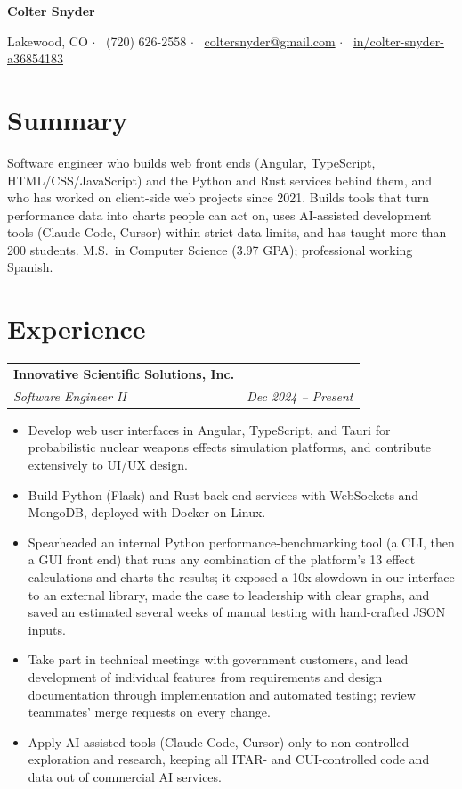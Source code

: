 \documentclass[letterpaper,10pt]{article}
\makeatletter
\newcommand{\entry}[4]{%
  \begin{tabularx}{\linewidth}{@{}X r@{}}
    \textbf{#1} & #2 \\
    \textit{#3} & \textit{\small #4} \\
  \end{tabularx}\vspace{-2pt}%
}
\makeatother
\begin{document}
\begin{center}
  {\Huge\bfseries Colter Snyder}\par\vspace{4pt}
  \small
  Lakewood, CO \enspace$\cdot$\enspace
  \faPhone*\ (720) 626-2558 \enspace$\cdot$\enspace
  \faEnvelope\ \href{mailto:coltersnyder@gmail.com}{coltersnyder@gmail.com} \enspace$\cdot$\enspace
  \faLinkedin\ \href{https://www.linkedin.com/in/colter-snyder-a36854183/}{in/colter-snyder-a36854183}
\end{center}

\section{Summary}
Software engineer who builds web front ends (Angular, TypeScript, HTML/CSS/JavaScript) and the Python and Rust
services behind them, and who has worked on client-side web projects since 2021. Builds tools that turn performance
data into charts people can act on, uses AI-assisted development tools (Claude Code, Cursor) within strict data
limits, and has taught more than 200 students. M.S.\ in Computer Science (3.97 GPA); professional working Spanish.

\section{Experience}

\entry{Innovative Scientific Solutions, Inc.}{}{Software Engineer II}{Dec 2024 -- Present}
\begin{itemize}
  \item Develop web user interfaces in Angular, TypeScript, and Tauri for probabilistic nuclear weapons effects
        simulation platforms, and contribute extensively to UI/UX design.
  \item Build Python (Flask) and Rust back-end services with WebSockets and MongoDB, deployed with Docker on Linux.
  \item Spearheaded an internal Python performance-benchmarking tool (a CLI, then a GUI front end) that runs any
        combination of the platform's 13 effect calculations and charts the results; it exposed a 10x slowdown in our
        interface to an external library, made the case to leadership with clear graphs, and saved an estimated
        several weeks of manual testing with hand-crafted JSON inputs.
  \item Take part in technical meetings with government customers, and lead development of individual features
        from requirements and design documentation through implementation and automated testing; review
        teammates' merge requests on every change.
  \item Apply AI-assisted tools (Claude Code, Cursor) only to non-controlled exploration and research, keeping all
        ITAR- and CUI-controlled code and data out of commercial AI services.
\end{itemize}
\end{document}
